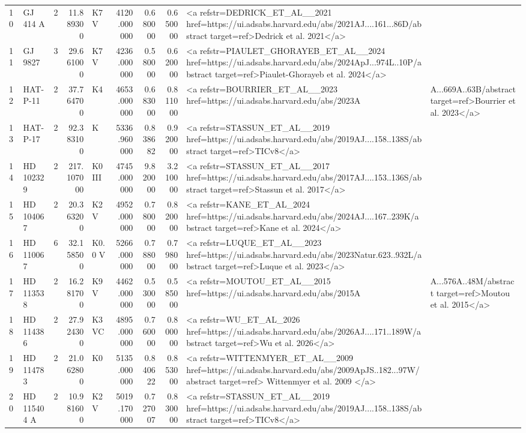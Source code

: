 \begin{tabular}{llrrlrrrl}
10 & GJ 414 A & 2 & 11.889300 & K7 V & 4120.000000 & 0.680000 & 0.650000 & <a refstr=DEDRICK_ET_AL__2021 href=https://ui.adsabs.harvard.edu/abs/2021AJ....161...86D/abstract target=ref>Dedrick et al. 2021</a> \\
11 & GJ 9827 & 3 & 29.661000 & K7 V & 4236.000000 & 0.580000 & 0.620000 & <a refstr=PIAULET_GHORAYEB_ET_AL__2024 href=https://ui.adsabs.harvard.edu/abs/2024ApJ...974L..10P/abstract target=ref>Piaulet-Ghorayeb et al. 2024</a> \\
12 & HAT-P-11 & 2 & 37.764700 & K4 & 4653.000000 & 0.683000 & 0.811000 & <a refstr=BOURRIER_ET_AL__2023 href=https://ui.adsabs.harvard.edu/abs/2023A&A...669A..63B/abstract target=ref>Bourrier et al. 2023</a> \\
13 & HAT-P-17 & 2 & 92.383100 & K & 5336.960000 & 0.838682 & 0.920000 & <a refstr=STASSUN_ET_AL__2019 href=https://ui.adsabs.harvard.edu/abs/2019AJ....158..138S/abstract target=ref>TICv8</a> \\
14 & HD 102329 & 2 & 217.107000 & K0 III & 4745.000000 & 9.820000 & 3.210000 & <a refstr=STASSUN_ET_AL__2017 href=https://ui.adsabs.harvard.edu/abs/2017AJ....153..136S/abstract target=ref>Stassun et al. 2017</a> \\
15 & HD 104067 & 2 & 20.363200 & K2V & 4952.000000 & 0.780000 & 0.820000 & <a refstr=KANE_ET_AL_2024 href=https://ui.adsabs.harvard.edu/abs/2024AJ....167..239K/abstract target=ref>Kane et al. 2024</a> \\
16 & HD 110067 & 6 & 32.158500 & K0.0 V & 5266.000000 & 0.788000 & 0.798000 & <a refstr=LUQUE_ET_AL__2023 href=https://ui.adsabs.harvard.edu/abs/2023Natur.623..932L/abstract target=ref>Luque et al. 2023</a> \\
17 & HD 113538 & 2 & 16.281700 & K9 V & 4462.000000 & 0.530000 & 0.585000 & <a refstr=MOUTOU_ET_AL__2015 href=https://ui.adsabs.harvard.edu/abs/2015A&A...576A..48M/abstract target=ref>Moutou et al. 2015</a> \\
18 & HD 114386 & 2 & 27.924300 & K3 VC & 4895.000000 & 0.760000 & 0.800000 & <a refstr=WU_ET_AL_2026 href=https://ui.adsabs.harvard.edu/abs/2026AJ....171..189W/abstract target=ref>Wu et al. 2026</a> \\
19 & HD 114783 & 2 & 21.062800 & K0 & 5135.000000 & 0.840622 & 0.853000 & <a refstr=WITTENMYER_ET_AL__2009 href=https://ui.adsabs.harvard.edu/abs/2009ApJS..182...97W/abstract target=ref> Wittenmyer et al. 2009 </a> \\
20 & HD 115404 A & 2 & 10.981600 & K2V & 5019.170000 & 0.727007 & 0.830000 & <a refstr=STASSUN_ET_AL__2019 href=https://ui.adsabs.harvard.edu/abs/2019AJ....158..138S/abstract target=ref>TICv8</a> \\

\end{tabular}
